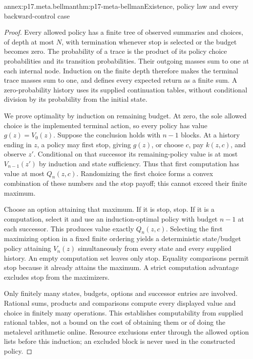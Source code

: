 \begin{annexitem}{annex:p17.meta.bellman}{thm:p17-meta-bellman}{Existence, policy law and every backward-control case}
\begin{proof}
Every allowed policy has a finite tree of observed summaries and
choices, of depth at most \(N\), with termination whenever stop
is selected or the budget becomes zero. The probability of a
trace is the product of its policy choice probabilities and its
transition probabilities. Their outgoing masses sum to one at
each internal node. Induction on the finite depth therefore makes
the terminal trace masses sum to one, and defines every expected
return as a finite sum. A zero-probability history uses its
supplied continuation tables, without conditional division by
its probability from the initial state.

We prove optimality by induction on remaining budget. At zero,
the sole allowed choice is the implemented terminal action, so
every policy has value \(g(z)=V_0(z)\).
Suppose the conclusion holds with \(n-1\) blocks. At a history
ending in \(z\), a policy may first stop, giving \(g(z)\),
or choose \(c\), pay \(k(z,c)\), and observe \(z'\).
Conditional on that successor its remaining-policy value is at
most \(V_{n-1}(z')\) by induction and state sufficiency.
Thus that first computation has value at most \(Q_n(z,c)\).
Randomizing the first choice forms a convex combination of these
numbers and the stop payoff; this cannot exceed their finite maximum.

Choose an option attaining that maximum. If it is stop, stop.
If it is a computation, select it and use an induction-optimal
policy with budget \(n-1\) at each successor. This produces
value exactly \(Q_n(z,c)\). Selecting the first maximizing
option in a fixed finite ordering yields a deterministic
state/budget policy attaining \(V_n(z)\) simultaneously from
every state and every supplied history. An empty computation
set leaves only stop. Equality comparisons permit stop because
it already attains the maximum. A strict computation advantage
excludes stop from the maximizers.

Only finitely many states, budgets, options and successor entries
are involved. Rational sums, products and comparisons compute
every displayed value and choice in finitely many operations.
This establishes computability from supplied rational tables,
not a bound on the cost of obtaining them or of doing the
metalevel arithmetic online. Resource exclusions enter through
the allowed option lists before this induction; an excluded
block is never used in the constructed policy.
\end{proof}
\end{annexitem}

